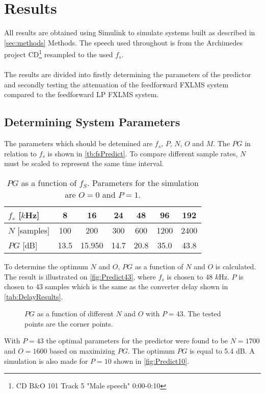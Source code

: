 \section{Results}
All results are obtained using Simulink\textsuperscript{\textregistered} to simulate systems built as described in \autoref{sec:methods} Methods. The speech used throughout is from the Archimedes project CD\footnote{CD B\&O 101 Track 5 "Male speech" 0:00-0:10} resampled to the used $f_s$.  
\\\\
The results are divided into firstly determining the parameters of the predictor and secondly testing the attenuation of the feedforward FXLMS system compared to the feedforward LP FXLMS system.   

\subsection{Determining System Parameters}
The parameters which should be detemined are $f_s$, $P$, $N$, $O$ and $M$.         
The $PG$ in relation to $f_s$ is shown in \autoref{tb:fsPredict}.
To compare different sample rates, $N$ must be scaled to represent the same time interval.  
\begin{table}[H]
\centering
\begin{tabular}{|l|c|c|c|c|c|c|}
\hline
$f_s$ {[}$k$Hz{]} & 8 & 16 & 24 & 48 & 96 & 192 \\ \hline 
$N$ {[}samples{]} & 100 & 200 & 300 & 600 & 1200 & 2400 \\ \hline 
$PG$ {[}dB{]} & 13.5 & 15.950 & 14.7 & 20.8 & 35.0 & 43.8 \\ \hline
\end{tabular}
\caption{$PG$ as a function of $f_S$. Parameters for the simulation are $O=0$ and $P=1$.}
\label{tb:fsPredict}
\end{table}

To determine the optimum  $N$ and $O$, $PG$ as a function of $N$ and $O$ is calculated. The result is illustrated on \autoref{fig:Predict43}, where $f_s$ is chosen to 48 $k$Hz. $P$ is chosen to 43 samples which is the same as the converter delay shown in \autoref{tab:DelayResults}. 

\begin{figure}[H]
	\centering
	
	\caption{$PG$ as a function of different $N$ and $O$ with $P=43$. The tested points are the corner points.}
	\label{fig:Predict43}
\end{figure}
With $P=43$ the optimal parameters for the predictor were found to be $N=1700$ and $O=1600$ based on maximizing $PG$. The optimum $PG$ is equal to 5.4 dB.
A simulation is also made for $P=10$ shown in \autoref{fig:Predict10}.

